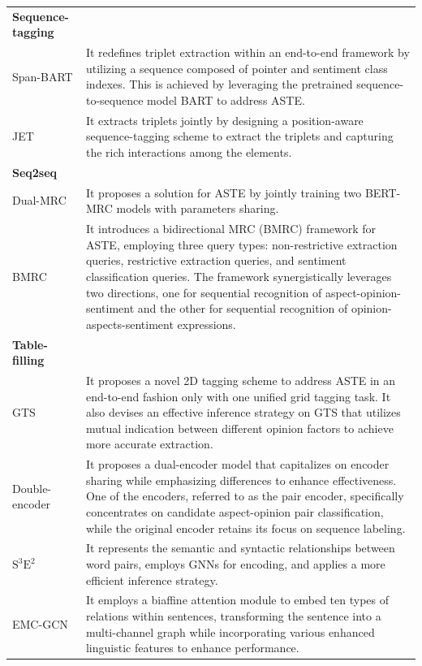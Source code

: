 \documentclass[11pt]{article}
\begin{document}
\begin{table}
{\begin{tabular}{lp{40em}}
    \midrule
    \textbf{Sequence-tagging} &       \\
    Span-BART \textrm{\cite{yan2021unified}} & It redefines triplet extraction within an end-to-end framework by utilizing a sequence composed of pointer and sentiment class indexes. This is achieved by leveraging the pretrained sequence-to-sequence model BART to address ASTE. \\
    JET \textrm{\cite{xu2020position}}   &  It extracts triplets jointly by designing a position-aware sequence-tagging scheme to extract the triplets and capturing the rich interactions among the elements.  \\
    \midrule
    \textbf{Seq2seq} &    \\
    Dual-MRC \textrm{\cite{mao2021joint}} & It proposes a solution for ASTE by jointly training two BERT-MRC models with parameters sharing. \\
    BMRC \textrm{\cite{chen2021bidirectional}} & It introduces a bidirectional MRC (BMRC) framework for ASTE, employing three query types: non-restrictive extraction queries, restrictive extraction queries, and sentiment classification queries. The framework synergistically leverages two directions, one for sequential recognition of aspect-opinion-sentiment and the other for sequential recognition of opinion-aspects-sentiment expressions. \\
    \midrule
    \textbf{Table-filling} &   \\
    GTS \textrm{\cite{wu2020grid}}   & It proposes a novel 2D tagging scheme to address ASTE in an end-to-end fashion only with one unified grid tagging task. 
    It also devises an effective inference strategy on GTS that utilizes mutual indication between different opinion factors to achieve more accurate extraction. \\
    Double-encoder \textrm{\cite{jing2021seeking}} & It proposes a dual-encoder model that capitalizes on encoder sharing while emphasizing differences to enhance effectiveness. 
    One of the encoders, referred to as the pair encoder, specifically concentrates on candidate aspect-opinion pair classification, while the original encoder retains its focus on sequence labeling. \\
    $\mathrm{S}^3\mathrm{E}^2$ \textrm{\cite{chen2021semantic}} &  It represents the semantic and syntactic relationships between word pairs, employs GNNs for encoding, and applies a more efficient inference strategy. \\
    EMC-GCN \textrm{\cite{chen2022enhanced}} & It employs a biaffine attention module to embed ten types of relations within sentences, transforming the sentence into a multi-channel graph while incorporating various enhanced linguistic features to enhance performance. 

\end{tabular}}
\end{table}
\end{document}
